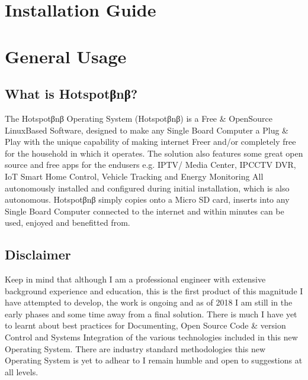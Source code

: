 \documentclass[letterpaper,10pt,openany,oneside,english]{sphinxmanual}
\begin{document}
\chapter{Installation Guide}
\label{\detokenize{installation:installation-guide}}\label{\detokenize{installation::doc}}

\chapter{General Usage}
\label{\detokenize{end-user:general-usage}}\label{\detokenize{end-user::doc}}

\section{What is Hotspotβnβ?}
\label{\detokenize{end-user:what-is-hotspotn}}
\sphinxAtStartPar
The Hotspotβnβ Operating System (Hotspotβnβ) is a Free \& Open\sphinxhyphen{}Source Linux\sphinxhyphen{}Based Software, designed to make any Single Board Computer a Plug \& Play  with the unique capability of making internet Freer and/or completely free for the household in which it operates. The solution also features some great open source and free apps for the end\sphinxhyphen{}users e.g. IPTV/ Media Center, IPCCTV DVR, IoT Smart Home Control, Vehicle Tracking and Energy Monitoring \sphinxhyphen{} All autonomously installed and configured during initial installation, which is also autonomous. Hotspotβnβ simply copies onto a Micro SD card, inserts into any Single Board Computer connected to the internet and within minutes can be used, enjoyed and benefitted from.


\section{Disclaimer}
\label{\detokenize{end-user:disclaimer}}
\sphinxAtStartPar
Keep in mind that although I am a professional engineer with extensive background experience and education, this is the first product of this magnitude I have attempted to develop, the work is ongoing and as of 2018 I am still in the early phases and some time away from a final solution. There is much I have yet to learnt about best practices for Documenting, Open Source Code \& version Control and Systems Integration of the various technologies included in this new Operating System. There are industry standard methodologies this new Operating System is yet to adhear to \sphinxhyphen{} I remain humble and open to suggestions at all levels.
\end{document}
